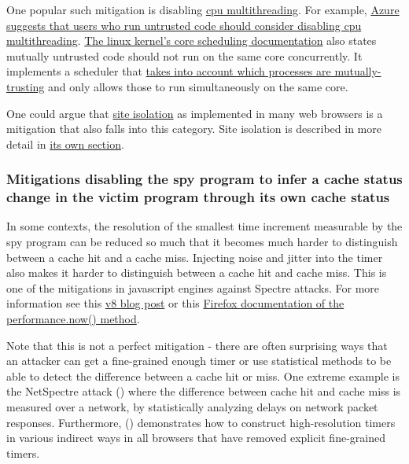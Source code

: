 \documentclass[
  a4paper,
]{report}
\begin{document}
One popular such mitigation is disabling
\href{https://en.wikipedia.org/wiki/Multithreading_(computer_architecture)}{cpu
multithreading}. For example,
\href{https://learn.microsoft.com/en-us/azure/virtual-machines/mitigate-se}{Azure
suggests that users who run untrusted code should consider disabling cpu
multithreading}.
\href{https://www.kernel.org/doc/Documentation/admin-guide/hw-vuln/core-scheduling.rst}{The
linux kernel's core scheduling documentation} also states mutually
untrusted code should not run on the same core concurrently. It
implements a scheduler that
\href{https://lwn.net/Articles/861251/}{takes into account which
processes are mutually-trusting} and only allows those to run
simultaneously on the same core.

One could argue that
\href{https://developer.chrome.com/blog/site-isolation/}{site
isolation} as implemented in many web browsers is a mitigation that also
falls into this category. Site isolation is described in more detail in
\hyperref[site-isolation]{its own section}.

\subsubsection{Mitigations disabling the spy program to infer a cache
status change in the victim program through its own cache
status}\label{mitigations-disabling-the-spy-program-to-infer-a-cache-status-change-in-the-victim-program-through-its-own-cache-status}

In some contexts, the resolution of the smallest time increment
measurable by the spy program can be reduced so much that it becomes
much harder to distinguish between a cache hit and a cache miss.
Injecting noise and jitter into the timer also makes it harder to
distinguish between a cache hit and cache miss. This is one of the
mitigations in javascript engines against Spectre attacks. For more
information see this \href{https://v8.dev/blog/spectre}{v8 blog post} or
this
\href{https://developer.mozilla.org/en-US/docs/Web/API/Performance/now}{Firefox
documentation of the performance.now() method}.

Note that this is not a perfect mitigation - there are often surprising
ways that an attacker can get a fine-grained enough timer or use
statistical methods to be able to detect the difference between a cache
hit or miss. One extreme example is the NetSpectre
attack () where the
difference between cache hit and cache miss is measured over a network,
by statistically analyzing delays on network packet responses.
Furthermore, ()
demonstrates how to construct high-resolution timers in various indirect
ways in all browsers that have removed explicit fine-grained timers.
\end{document}
